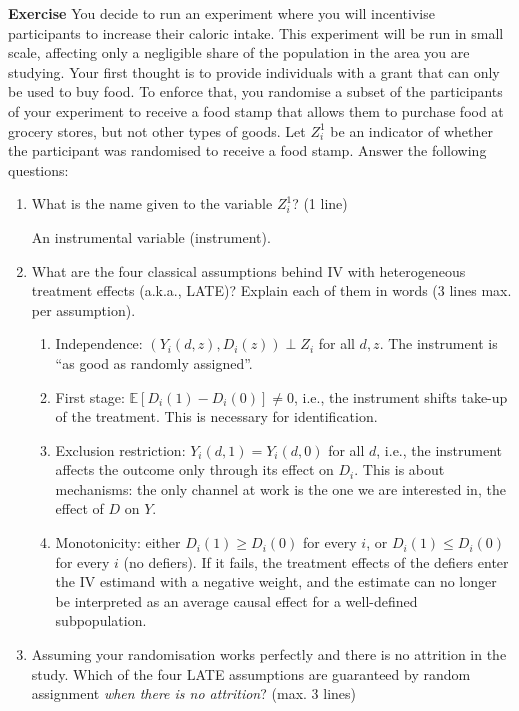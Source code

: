 \documentclass[10pt]{article}
\newcounter{exercise}
\newenvironment{exercise}%
{%
	\refstepcounter{exercise}%
	\textbf{Exercise \theexercise}%
	}%
{
 \par\vspace{\baselineskip}%
\noindent\ignorespacesafterend
}
\begin{document}
\begin{exercise}\label{indep}
	You decide to run an experiment where you will incentivise participants to increase their caloric intake. This experiment will be run in small scale, affecting only a negligible share of the population in the area you are studying.
	Your first thought is to provide individuals with a grant that can only be used to buy food. To enforce that, you randomise a subset of the participants of your experiment to receive a food stamp that allows them to purchase food at grocery stores, but not other types of goods. Let $ Z^{1}_{i} $ be an indicator of whether the participant was randomised to receive a food stamp. Answer the following questions:
	\begin{enumerate}
		\item What is the name given to the variable $ Z^{1}_{i} $? (1 line)

		\color{red}
		An instrumental variable (instrument).
		\color{black}
		\item What are the four classical assumptions behind IV \citep{imbens1994} with heterogeneous treatment effects (a.k.a., LATE)? Explain each of them in words (3 lines max. per assumption).

		\color{red}
		\begin{enumerate}
			\item Independence: $ \left(Y_i(d,z), D_i(z)\right) \perp Z_i $ for all $ d, z $. The instrument is ``as good as randomly assigned''.
			\item First stage: $\mathbb{E} \left[ D_i(1) - D_i(0) \right] \neq 0 $, i.e., the instrument shifts take-up of the treatment. This is necessary for identification.
			\item Exclusion restriction: $ Y_i(d,1) = Y_i(d,0) $ for all $d$, i.e., the instrument affects the outcome only through its effect on $ D_i $. This is about mechanisms: the only channel at work is the one we are interested in, the effect of $ D $ on $ Y $.
			\item Monotonicity: either $ D_i(1) \geq D_i(0) $ for every $ i $, or $ D_i(1) \leq D_i(0) $ for every $ i $ (no defiers). If it fails, the treatment effects of the defiers enter the IV estimand with a negative weight, and the estimate can no longer be interpreted as an average causal effect for a well-defined subpopulation.
		\end{enumerate}
		\color{black}
		\item Assuming your randomisation works perfectly and there is no attrition in the study. Which of the four LATE assumptions are guaranteed by random assignment \textit{when there is no attrition}? (max. 3 lines)


\end{enumerate}
\end{exercise}
\end{document}
